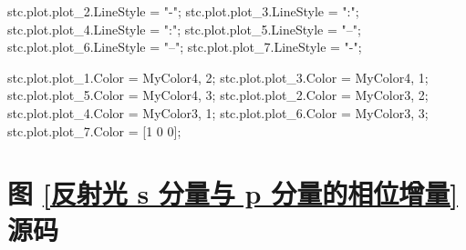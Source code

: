 \documentclass[UTF8]{report}
\theoremstyle{MyLineTheoremStyle} %
\theoremstyle{MyBlockTheoremStyle} %
\theoremstyle{MySubsubsectionStyle} %
\begin{document}
\begin{matlablisting}
    stc.plot.plot_2.LineStyle = "-";
    stc.plot.plot_3.LineStyle = ":";
    stc.plot.plot_4.LineStyle = ":";
    stc.plot.plot_5.LineStyle = "--";
    stc.plot.plot_6.LineStyle = "--";
    stc.plot.plot_7.LineStyle = "-";

    stc.plot.plot_1.Color = MyColor{4, 2};
    stc.plot.plot_3.Color = MyColor{4, 1};
    stc.plot.plot_5.Color = MyColor{4, 3};
    stc.plot.plot_2.Color = MyColor{3, 2};
    stc.plot.plot_4.Color = MyColor{3, 1};
    stc.plot.plot_6.Color = MyColor{3, 3}; 
    stc.plot.plot_7.Color = [1 0 0];   
\end{matlablisting}

\section{图 \ref{反射光 s 分量与 p 分量的相位增量} 源码}
\label{反射光 s 分量与 p 分量的相位增量 源码}
\end{document}
